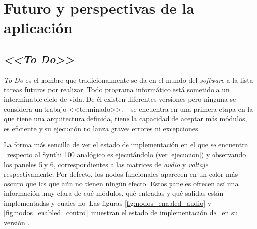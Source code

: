 \singlespacing
\chapter[Futuro de la aplicación]{Futuro y perspectivas de la aplicación}
\onehalfspacing


\section{\textit{<<To Do>>}}

\textit{To Do} es el nombre que tradicionalmente se da en el mundo del \textit{software} a la lista tareas futuras por realizar. Todo programa informático está sometido a un interminable ciclo de vida. De él existen diferentes versiones pero ninguna se considera un trabajo <<terminado>>. \appName~ se encuentra en una primera etapa en la que tiene una arquitectura definida, tiene la capacidad de aceptar más módulos, es eficiente y su ejecución no lanza graves errores ni excepciones.

La forma más sencilla de ver el estado de implementación en el que se encuentra \appName~respecto al Synthi 100 analógico es ejecutándolo (ver \ref{ejecucion}) y observando los paneles 5 y 6, correspondientes a las matrices de \textit{audio} y \textit{voltaje} respectivamente. Por defecto, los nodos funcionales aparecen en un color más oscuro que los que aún no tienen ningún efecto. Estos paneles ofrecen así una información muy clara de qué módulos, qué entradas y qué salidas están implementadas y cuales no. Las figuras \ref{fig:nodos_enabled_audio} y \ref{fig:nodos_enabled_control} muestran el estado de implementación de \appName~en su versión \version.


